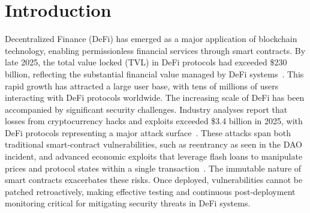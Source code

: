 
\section{Introduction}
\label{sec:introduction}
Decentralized Finance (DeFi) has emerged as a major application of blockchain technology, enabling permissionless financial services through smart contracts.
By late 2025, the total value locked (TVL) in DeFi protocols had exceeded \$230 billion, reflecting the substantial financial value managed by DeFi systems~\cite{defiTVL2025}.
This rapid growth has attracted a large user base, with tens of millions of users interacting with DeFi protocols worldwide.
The increasing scale of DeFi has been accompanied by significant security challenges.
Industry analyses report that losses from cryptocurrency hacks and exploits exceeded \$3.4 billion in 2025, with DeFi protocols representing a major attack surface~\cite{cryptoLoss2025,chainalysis2025report}.
These attacks span both traditional smart-contract vulnerabilities, such as reentrancy as seen in the DAO incident, and advanced economic exploits that leverage flash loans to manipulate prices and protocol states within a single transaction~\cite{qin2020flashloan}.
The immutable nature of smart contracts exacerbates these risks.
Once deployed, vulnerabilities cannot be patched retroactively, making effective testing and continuous post-deployment monitoring critical for mitigating security threats in DeFi systems.
 

